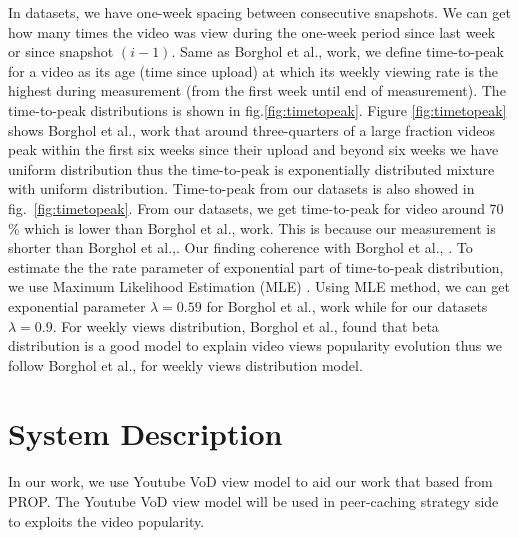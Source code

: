\documentclass[10pt,final,journal,a4paper]{IEEEtran}
\begin{document}
In datasets, we have one-week spacing between consecutive snapshots.  
We can get how many times the video was view during the one-week period since last week or since snapshot $(i-1)$. 
Same as Borghol et al., \cite{Borghol:2011:CMP:2039452.2039717} work, we define time-to-peak for a video as its age (time since upload) at which its weekly viewing rate is the highest during measurement (from the first week until end of measurement).
The time-to-peak distributions is shown in fig.\ref{fig:timetopeak}.
Figure \ref{fig:timetopeak} shows Borghol et al., \cite{Borghol:2011:CMP:2039452.2039717} work that around three-quarters of a large fraction videos peak within the first six weeks since their upload and beyond six weeks we have uniform distribution thus the time-to-peak is exponentially distributed mixture with uniform distribution. 
Time-to-peak from our datasets is also showed in fig.~\ref{fig:timetopeak}.
From our datasets, we get time-to-peak for video around $70$\% which is lower than Borghol et al., work. 
This is because our measurement is shorter than Borghol et al.,\cite{Borghol:2011:CMP:2039452.2039717}.
Our finding coherence with Borghol et al., \cite{Borghol:2011:CMP:2039452.2039717}.
To estimate the the rate parameter of exponential part of time-to-peak distribution, we use Maximum Likelihood Estimation (MLE) \cite{clauset2009power}.
Using MLE method, we can get exponential parameter $\lambda = 0.59$ for Borghol et al., work while for our datasets $\lambda=0.9$. 
For weekly views distribution, Borghol et al., \cite{Borghol:2011:CMP:2039452.2039717} found that beta distribution is a good model to explain video views popularity evolution thus we follow Borghol et al., \cite{Borghol:2011:CMP:2039452.2039717} for  weekly views distribution model.





\section{System Description}\label{systemdescription}
In our work, we use Youtube VoD view model to aid our work that based from PROP. 
The Youtube VoD view model will be used in peer-caching strategy side to exploits the video popularity. 
\end{document}
